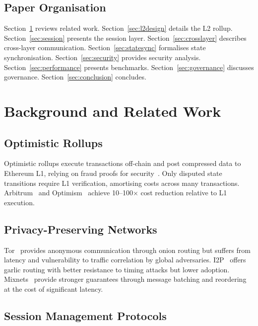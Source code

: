 \documentclass[11pt,a4paper]{article}
\begin{document}
\subsection{Paper Organisation}

Section~\ref{sec:background} reviews related work.
Section~\ref{sec:l2design} details the L2 rollup.
Section~\ref{sec:session} presents the session layer.
Section~\ref{sec:crosslayer} describes cross-layer communication.
Section~\ref{sec:statesync} formalises state synchronisation.
Section~\ref{sec:security} provides security analysis.
Section~\ref{sec:performance} presents benchmarks.
Section~\ref{sec:governance} discusses governance.
Section~\ref{sec:conclusion} concludes.

\section{Background and Related Work}
\label{sec:background}

\subsection{Optimistic Rollups}

Optimistic rollups execute transactions off-chain and post compressed data
to Ethereum L1, relying on fraud proofs for
security~\cite{kalodner2018arbitrum,optimism2021}.  Only disputed state
transitions require L1 verification, amortising costs across many
transactions.  Arbitrum~\cite{kalodner2018arbitrum} and
Optimism~\cite{optimism2021} achieve 10--100$\times$ cost reduction relative
to L1 execution.

\subsection{Privacy-Preserving Networks}

Tor~\cite{dingledine2004tor} provides anonymous communication through onion
routing but suffers from latency and vulnerability to traffic correlation by
global adversaries.  I2P~\cite{zantout2011i2p} offers garlic routing with
better resistance to timing attacks but lower adoption.
Mixnets~\cite{chaum1981untraceable,danezis2003mixminion} provide stronger
guarantees through message batching and reordering at the cost of
significant latency.

\subsection{Session Management Protocols}
\end{document}
